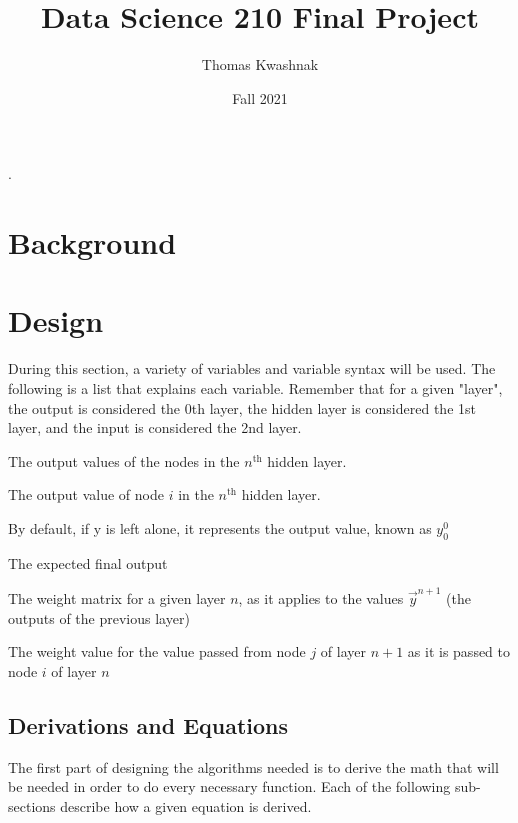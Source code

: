 \documentclass[10pt]{article}
\title{Data Science 210 Final Project}
\author{Thomas Kwashnak}
\date{Fall 2021}
\begin{document}
\maketitle
\setlength{\parindent}{0pt}.
\setlength{\parskip}{\baselineskip}
\lstset{numbers=left, numberstyle=\footnotesize, frame=l} 


\section{Background}
\section{Design}
During this section, a variety of variables and variable syntax will be used. The following is a list that explains each variable. Remember that for a given "layer", the output is considered the 0th layer, the hidden layer is considered the 1st layer, and the input is considered the 2nd layer.
\begin{description}[style=nextline]
    \item[$\vec{y}^n$] The output values of the nodes in the $n^{\text{th}}$ hidden layer. 
    \item[$y^n_i$] The output value of node $i$ in the $n^{\text{th}}$ hidden layer.
    \item[$y$] By default, if y is left alone, it represents the output value, known as $y^0_0$ 
    \item[$\hat{y}$] The expected final output 
    \item[$W^n$] The weight matrix for a given layer $n$, as it applies to the values $\vec{y}^{n+1}$ (the outputs of the previous layer) 
    \item[$w^n_{i,j}$] The weight value for the value passed from node $j$ of layer $n+1$ as it is passed to node $i$ of layer $n$
\end{description}
\subsection{Derivations and Equations}
The first part of designing the algorithms needed is to derive the math that will be needed in order to do every necessary function. Each of the following sub-sections describe how a given equation is derived.
\end{document}
